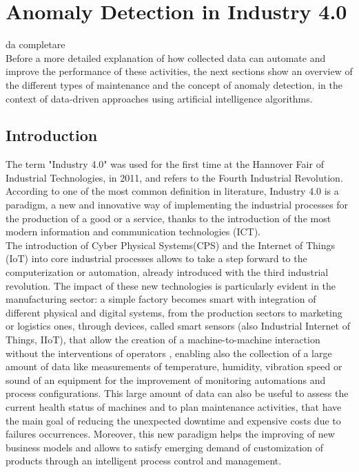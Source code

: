 \chapter{Anomaly Detection in Industry 4.0}

da completare\\
Before a more detailed explanation of how collected data can automate and improve the performance of these activities, the next sections show an overview of the different types of maintenance and the concept of anomaly detection, in the context of data-driven approaches using artificial intelligence algorithms. 

\section{Introduction}
The term "Industry 4.0" was used for the first time at the Hannover Fair of Industrial Technologies, in 2011, and refers to the Fourth Industrial Revolution. According to one of the most common definition in literature, Industry 4.0 is a paradigm, a new and innovative way of implementing the industrial processes for the production of a good or a service, thanks to the introduction of the most modern information and communication technologies (ICT). \\ 
The introduction of Cyber Physical Systems(CPS) and the Internet of Things (IoT) into core industrial processes allows to take a step forward to the computerization or automation, already introduced with the third industrial revolution. The impact of these new technologies is particularly evident in the manufacturing sector: a simple factory becomes smart with integration of different physical and digital systems, from the production sectors to marketing or logistics ones, through devices, called smart sensors (also Industrial Internet of Things, IIoT), that allow the creation of a machine-to-machine interaction without the interventions of operators \cite{1smartfactory}, enabling also the collection of a large amount of data like measurements of temperature, humidity, vibration speed or sound of an equipment for the improvement of monitoring automations and process configurations. This large amount of data can also be useful to assess the current health status of machines and to plan maintenance activities, that have the main goal of reducing the unexpected downtime and expensive costs due to failures occurrences. Moreover, this new paradigm helps the improving of new business models and allows to satisfy emerging demand of customization of products through an intelligent process control and management.\\


